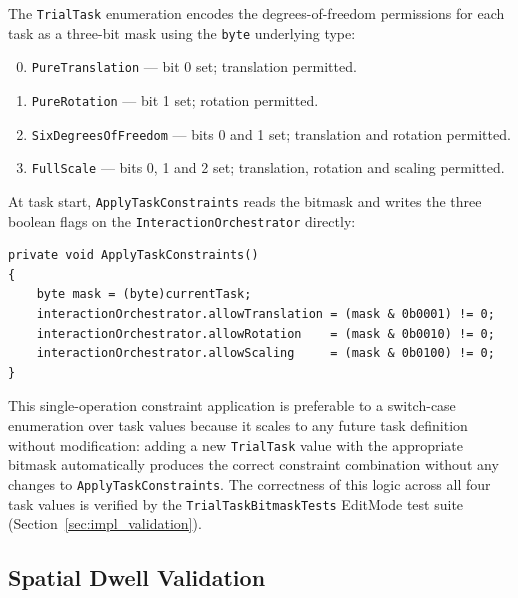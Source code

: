 The \texttt{TrialTask} enumeration encodes the degrees-of-freedom permissions for each task as a three-bit mask using the \texttt{byte} underlying type:

\begin{enumerate}[nosep, label=\texttt{0b\,\textsubscript{\arabic*}}]
    \setcounter{enumi}{-1}
    \item[\texttt{0b0001}] \texttt{PureTranslation} --- bit 0 set; translation permitted.
    \item[\texttt{0b0010}] \texttt{PureRotation} --- bit 1 set; rotation permitted.
    \item[\texttt{0b0011}] \texttt{SixDegreesOfFreedom} --- bits 0 and 1 set; translation and rotation permitted.
    \item[\texttt{0b0111}] \texttt{FullScale} --- bits 0, 1 and 2 set; translation, rotation and scaling permitted.
\end{enumerate}

At task start, \texttt{ApplyTaskConstraints} reads the bitmask and writes the three boolean flags on the \texttt{InteractionOrchestrator} directly:

\begin{lstlisting}[language={[Sharp]C}, caption={Bitmask constraint
application in \texttt{TrialOrchestrator.ApplyTaskConstraints}.},
label={lst:bitmask}]
private void ApplyTaskConstraints()
{
    byte mask = (byte)currentTask;
    interactionOrchestrator.allowTranslation = (mask & 0b0001) != 0;
    interactionOrchestrator.allowRotation    = (mask & 0b0010) != 0;
    interactionOrchestrator.allowScaling     = (mask & 0b0100) != 0;
}
\end{lstlisting}

This single-operation constraint application is preferable to a switch-case enumeration over task values because it scales to any future task definition without modification: adding a new \texttt{TrialTask} value with the appropriate bitmask automatically produces the correct constraint combination without any changes to \texttt{ApplyTaskConstraints}. The correctness of this logic across all four task values is verified by the \texttt{TrialTaskBitmaskTests} EditMode test suite (Section~\ref{sec:impl_validation}).


\subsection{Spatial Dwell Validation}
\label{sec:dwell_impl}


